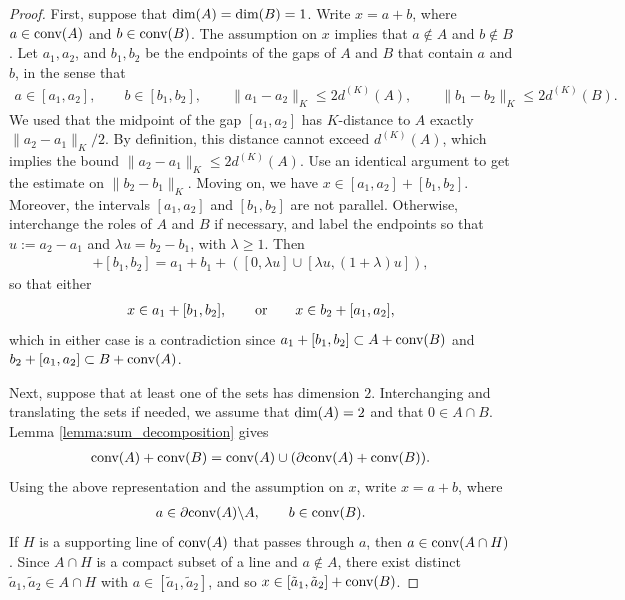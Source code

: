 \documentclass[11pt]{article}
\begin{document}
\begin{proof}
    First, suppose that $\textup{dim}(A)=\textup{dim}(B)=1$. Write $x=a+b$, where $a\in \textup{conv}(A)$ and $b\in \textup{conv}(B)$. The assumption on $x$ implies that $a\notin A$ and $b\notin B$. Let $a_1,a_2$, and $b_1,b_2$ be the endpoints of the gaps of $A$ and $B$ that contain $a$ and $b$, in the sense that
    \begin{align*}
        a\in [a_1,a_2],\qquad b\in [b_1,b_2],\qquad \|a_1-a_2\|_K\leq 2d^{(K)}(A),\qquad \|b_1-b_2\|_K\leq 2d^{(K)}(B).
    \end{align*}
    We used that the midpoint of the gap $[a_1,a_2]$ has $K$-distance to $A$ exactly $\|a_2-a_1\|_K/2$. By definition, this distance cannot exceed $d^{(K)}(A)$, which implies the bound $\|a_2-a_1\|_K\leq 2d^{(K)}(A)$. Use an identical argument to get the estimate on $\|b_2-b_1\|_K$. Moving on, we have $x\in [a_1,a_2]+[b_1,b_2]$. Moreover, the intervals $[a_1,a_2]$ and $[b_1,b_2]$ are not parallel. Otherwise, interchange the roles of $A$ and $B$ if necessary, and label the endpoints so that $u:=a_2-a_1$ and $\lambda u=b_2-b_1$, with $\lambda\geq 1$. Then
    \begin{align*}
        [a_1,a_2]+[b_1,b_2]=a_1+b_1+([0,\lambda u]\cup [\lambda u,(1+\lambda)u]),
    \end{align*}
    so that either 
    \begin{align*}
        x\in a_1+[b_1,b_2],\qquad \textup{or}\qquad x\in b_2+[a_1,a_2],
    \end{align*}
    which in either case is a contradiction since $a_1+[b_1,b_2]\subset A+\textup{conv}(B)$ and $b_2+[a_1,a_2]\subset B+\textup{conv}(A)$.

    Next, suppose that at least one of the sets has dimension $2$. Interchanging and translating the sets if needed, we assume that $\textup{dim}(A)=2$ and that $0\in A\cap B$. Lemma \ref{lemma:sum_decomposition} gives
    \begin{align*}
        \textup{conv}(A)+\textup{conv}(B)=\textup{conv}(A)\cup (\partial \textup{conv}(A)+\textup{conv}(B)).
    \end{align*}
    Using the above representation and the assumption on $x$, write $x=a+b$, where 
    \begin{align*}
        a\in \partial\textup{conv}(A)\backslash A,\qquad b\in \textup{conv}(B).
    \end{align*}
    If $H$ is a supporting line of $\textup{conv}(A)$ that passes through $a$, then $a\in \textup{conv}(A\cap H)$. Since $A\cap H$ is a compact subset of a line and $a\notin A$, there exist distinct $\tilde{a}_1,\tilde{a}_2\in A\cap H$ with $a\in [\tilde{a}_1,\tilde{a}_2]$, and so $x\in [\tilde{a}_1,\tilde{a}_2]+\textup{conv}(B)$.


\end{proof}
\end{document}
